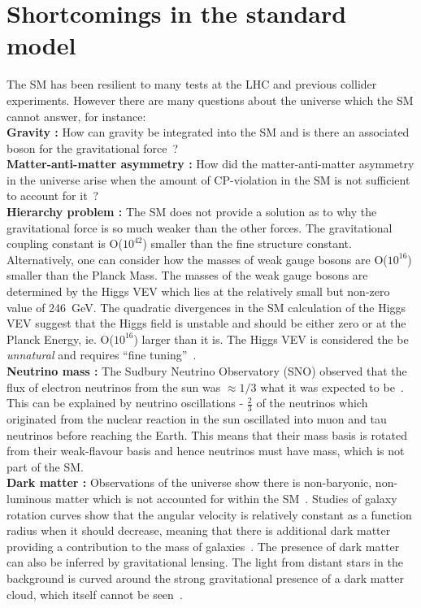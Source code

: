 \section{Shortcomings in the standard model ~\label{sec:SMprobs}}
The SM has been resilient to many tests at the LHC and previous collider experiments. However there are many questions about the universe which the SM cannot answer, for instance:\\
{\bf Gravity :} How can gravity be integrated into the SM and is there an associated boson for the gravitational force~\cite{PhysRevLett.107.171101,PhysRevD.82.122001}? \\
{\bf Matter-anti-matter asymmetry :} How did the matter-anti-matter asymmetry in the universe arise when the amount of CP-violation in the SM is not sufficient to account for it~\cite{RevModPhys.76.1}?\\
{\bf Hierarchy problem :} 
The SM does not provide a solution as to why the gravitational force is so much weaker than the other forces. The gravitational coupling constant is O($10^{42}$) smaller than the fine structure constant. Alternatively, one can consider how the masses of weak gauge bosons are O($10^{16}$) smaller than the Planck Mass. The masses of the weak gauge bosons are determined by the Higgs VEV which lies at the relatively small but non-zero value of 246~GeV. The quadratic divergences in the SM calculation of the Higgs VEV suggest that the Higgs field is unstable and should be either zero or at the Planck Energy, ie. O($10^{16}$) larger than it is. The Higgs VEV is considered the be \emph{unnatural} and requires ``fine tuning''~\cite{PhysRevD.20.2619}.\\
{\bf Neutrino mass :}
The Sudbury Neutrino Observatory (SNO) observed that the flux of electron neutrinos from the sun was $\approx 1/3$ what it was expected to be~\cite{PhysRevC.88.025501}. This can be explained by neutrino oscillations - $\frac{2}{3}$ of the neutrinos which originated from the nuclear reaction in the sun oscillated into muon and tau neutrinos before reaching the Earth. This means that their mass basis is rotated from their weak-flavour basis and hence neutrinos must have mass, which is not part of the SM.\\
{\bf Dark matter :} Observations of the universe show there is non-baryonic, non-luminous matter which is not accounted for within the SM~\cite{RubinFord}. Studies of galaxy rotation curves show that the angular velocity is relatively constant as a function radius when it should decrease, meaning that there is additional dark matter providing a contribution to the mass of galaxies~\cite{Volders,
Jog:2002dg,
Persic:1995ru}. The presence of dark matter can also be inferred by gravitational lensing. The light from distant stars in the background is curved around the strong gravitational presence of a dark matter cloud, which itself cannot be seen~\cite{Einstein,Ellis2010}. 
